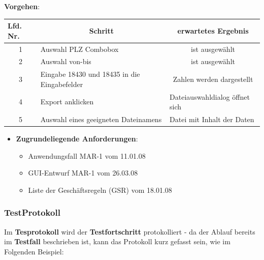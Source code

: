     \noindent
    \textbf{Vorgehen}:
    \begin{table}[]
        \centering
        \setlength{\tabcolsep}{0.5em}
        \def\arraystretch{1.5}
        \begin{tabular}{|c|l|c|}
            \hline
            \multicolumn{1}{|l|}{\textbf{Lfd. Nr.}} & \multicolumn{1}{c|}{\textbf{Schritt}}        & \textbf{erwartetes Ergebnis}                        \\ \hline
            1                                       & Auswahl PLZ Combobox                         & ist ausgewählt                                      \\ \hline
            2                                       & Auswahl von-bis                              & ist ausgewählt                                      \\ \hline
            3                                       & Eingabe 18430 und 18435 in die Eingabefelder & Zahlen werden dargestellt                           \\ \hline
            4                              & Export anklicken                             & \multicolumn{1}{l|}{Dateiauswahldialog öffnet sich} \\ \hline
            5                              & Auswahl eines geeigneten Dateinamens         & \multicolumn{1}{l|}{Datei mit Inhalt der Daten}     \\ \hline
        \end{tabular}
    \end{table}

\begin{itemize}
    \item[] \textbf{Zugrundeliegende Anforderungen}:
    \begin{itemize}
        \item Anwendungsfall MAR-1 vom 11.01.08
        \item GUI-Entwurf MAR-1 vom 26.03.08
        \item Liste der Geschäftsregeln (GSR) vom 18.01.08
    \end{itemize}
\end{itemize}

\subsubsection*{TestProtokoll}
Im \textbf{Tesprotokoll} wird der \textbf{Testfortschritt} protokolliert - da der Ablauf bereits im \textbf{Testfall} beschrieben ist, kann das Protokoll kurz gefasst sein, wie im Folgenden Beispiel:

